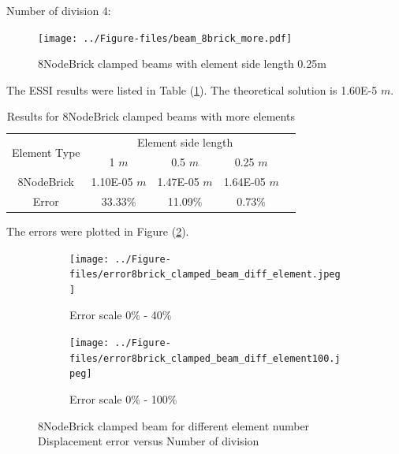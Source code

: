\documentclass[fleqn,11pt]{article}
\begin{document}
Number of division 4:

\begin{figure}[H]
  \centering
  \texttt{[image: ../Figure-files/beam\_8brick\_more.pdf]}
  \caption{8NodeBrick clamped beams with element side length 0.25m}
  \label{fig 8NodeBrick clamped beams with element side length 0.25m}
\end{figure}


The ESSI results were listed in Table (\ref{table Results for 8NodeBrick clamped beams with more elements}). 
The theoretical solution is 1.60E-5 $m$. 

\begin{table}[H]
  \centering
  \caption{Results for 8NodeBrick clamped beams with more elements}
  \label{table Results for 8NodeBrick clamped beams with more elements}
  \begin{tabular}{|c|c|c|c|c|}
    \hline 
    \multirow{2}{*}{Element Type} 
       & \multicolumn{3}{|c|}{Element side length} \\ \cline{2-4}
       & 1 $m$ & 0.5 $m$ & 0.25 $m$ \\                              \hline
8NodeBrick & 1.10E-05 $m$ & 1.47E-05 $m$ & 1.64E-05 $m$ \\ \hline
Error      & 33.33\%  & 11.09\%  & 0.73\%   \\ \hline
  \end{tabular}
\end{table}

The errors were plotted in Figure (\ref{fig error 8NodeBrick clamped beam for different element number}).

\begin{figure}[H]
  \begin{subfigure}{0.5\textwidth}
    \centering
    \texttt{[image: ../Figure-files/error8brick\_clamped\_beam\_diff\_element.jpeg]}
    \caption{Error scale 0\% - 40\%}
  \end{subfigure}
  \begin{subfigure}{0.5\textwidth}
    \centering
    \texttt{[image: ../Figure-files/error8brick\_clamped\_beam\_diff\_element100.jpeg]}
    \caption{Error scale 0\% - 100\%}
  \end{subfigure}
  \captionsetup{justification=centering,margin=3cm}
  \caption{8NodeBrick clamped beam for different element number\\
      Displacement error   versus   Number of division}
  \label{fig error 8NodeBrick clamped beam for different element number}
\end{figure}
\end{document}
